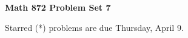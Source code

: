 \documentclass[12pt]{article}
\begin{document}
\def\ctln{\centerline}
\def\msk{\medskip}
\def\bsk{\bigskip}
\def\ssk{\smallskip}
\def\hsk{\hskip.3in}
\def\ra{\rightarrow}
\def\ubr{\underbar}

\def\mt{{\mathcal T}}
\def\mb{{\mathcal B}}
\def\ms{{\mathcal S}}
\def\mu{{\mathcal U}}
\def\mv{{\mathcal V}}

\def\bbr{{\mathbb R}}
\def\bbz{{\mathbb Z}}
\def\bbq{{\mathbb Q}}
\def\spc{$~$\hskip.15in$~$}

\def\sset{\subseteq}
\def\del{\partial}
\def\lra{$\Leftrightarrow$}
\def\bra{$\Rightarrow$}
\def\wtl{\widetilde}



\ctln{\bf Math 872 Problem Set 7}

\msk

Starred (*) problems are due Thursday, April 9.
\end{document}
